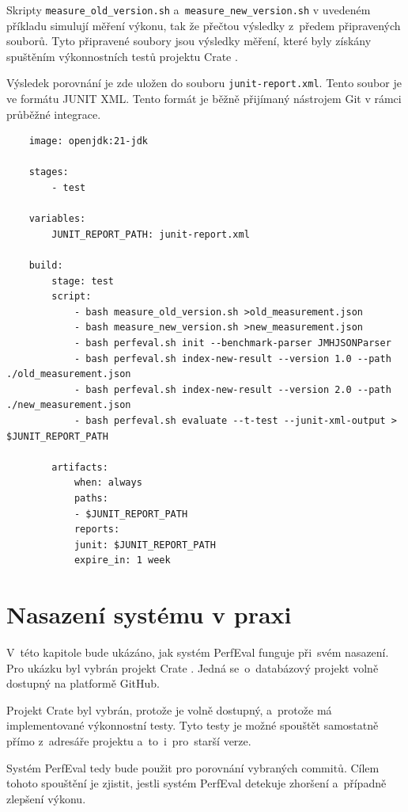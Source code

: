 Skripty \texttt{measure\_old\_version.sh} a~\texttt{measure\_new\_version.sh} v uvedeném příkladu
simulují měření výkonu, tak že přečtou výsledky z~předem připravených souborů. Tyto připravené soubory
jsou výsledky měření, které byly získány spuštěním výkonnostních testů projektu Crate \cite{crateDB}.

Výsledek porovnání je zde uložen do souboru \texttt{junit-report.xml}. Tento soubor je ve formátu JUNIT XML.
Tento formát je běžně přijímaný nástrojem Git v rámci průběžné integrace.
\bigskip
\bigskip

\begin{lstlisting}
    image: openjdk:21-jdk

    stages:
        - test

    variables:
        JUNIT_REPORT_PATH: junit-report.xml

    build:
        stage: test
        script:
            - bash measure_old_version.sh >old_measurement.json
            - bash measure_new_version.sh >new_measurement.json
            - bash perfeval.sh init --benchmark-parser JMHJSONParser
            - bash perfeval.sh index-new-result --version 1.0 --path ./old_measurement.json
            - bash perfeval.sh index-new-result --version 2.0 --path ./new_measurement.json
            - bash perfeval.sh evaluate --t-test --junit-xml-output > $JUNIT_REPORT_PATH

        artifacts:
            when: always
            paths:
            - $JUNIT_REPORT_PATH
            reports:
            junit: $JUNIT_REPORT_PATH
            expire_in: 1 week

\end{lstlisting}

\section{Nasazení systému v praxi}

V~této kapitole bude ukázáno, jak systém PerfEval funguje při~svém nasazení.
Pro ukázku byl vybrán projekt Crate \cite{crateDB}. Jedná se~o~databázový projekt
volně dostupný na platformě GitHub.

Projekt Crate byl vybrán, protože je volně dostupný, a~protože má implementované výkonnostní testy.
Tyto testy je možné spouštět samostatně přímo z~adresáře projektu a~to~i~pro~starší verze.

Systém PerfEval tedy bude použit pro porovnání vybraných commitů. Cílem tohoto
spouštění je zjistit, jestli systém PerfEval detekuje zhoršení a~případně zlepšení
výkonu.

